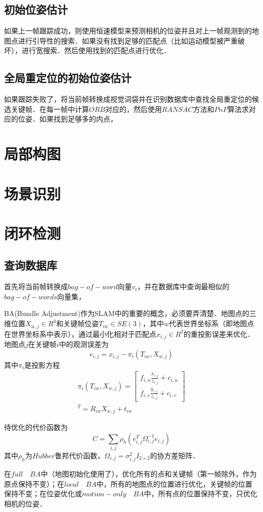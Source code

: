 \documentclass{article}
\begin{document}
\subsection{初始位姿估计}
如果上一帧跟踪成功，则使用恒速模型来预测相机的位姿并且对上一帧观测到的地图点进行引导性的搜索．如果没有找到足够的匹配点（比如运动模型被严重破坏），进行宽搜索．然后使用找到的匹配点进行优化．

\subsection{全局重定位的初始位姿估计}
如果跟踪失败了，将当前帧转换成视觉词袋并在识别数据库中查找全局重定位的候选关键帧．在每一帧中计算$ORB$对应的，然后使用$RANSAC$方法和$PnP$算法求对应的位姿．如果找到足够多的内点，
\section{局部构图}

\section{场景识别}

\section{闭环检测}
\subsection{查询数据库}
首先将当前帧转换成$bag-of-word$向量$v_t$，并在数据库中查询最相似的$bag-of-words$向量集，


\begin{appendix}
BA(Bundle Adjustment)作为SLAM中的重要的概念，必须要弄清楚．地图点的三维位置$X_{w,j}\in R^3$和关键帧位姿$T_{iw}\in SE(3)$，其中$w$代表世界坐标系（即地图点在世界坐标系中表示），通过最小化相对于匹配点$x_{i,j}\in R^2$的重投影误差来优化．地图点$j$在关键帧$i$中的观测误差为
$$e_{i,j}=x_{i,j}-\pi_i(T_{iw},X_{w,j})$$	
其中$\pi_i$是投影方程
$$
\begin{array}{c}
\pi_i(T_{iw},X_{w,j})=
\left[
\begin{array}{c}
	f_{i,u}\frac{x_{i,j}}{z_{i,j}}+c_{i,u} \\
	f_{i,v}\frac{y_{i,j}}{z_{i,j}}+c_{i,v}
\end{array}
\right] \\

[x_{i,j}\quad y_{i,j}\quad z_{i,j}]^T = R_{iw} X_{w,j}+t_{iw}
\end{array}
$$

待优化的代价函数为
$$
C=\sum_{i,j}\rho_h(e_{i,j}^T\Omega_{i,j}^{-1}e_{i,j})
$$
其中$\rho_h$为$Hubber$鲁邦代价函数，$\Omega_{i,j}=\sigma^2_{i,j}I_{2\times2}$的协方差矩阵．

在$full\quad
 BA$中（地图初始化使用了），优化所有的点和关键帧（第一帧除外，作为原点保持不变）；在$local\quad BA$中，所有的地图点的位置进行优化，关键帧的位置保持不变；在位姿优化或$motion-only \quad BA$中，所有点的位置保持不变，只优化相机的位姿．
\end{appendix}
\end{document}
